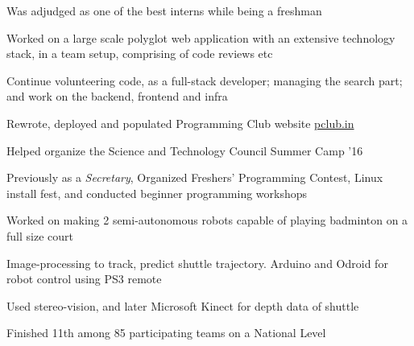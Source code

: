\documentclass[a4paper]{deedy-resume} %
\begin{document}
\begin{minipage}[t]{0.66\textwidth}
  \sectionspace

  \runsubsection{}

  \begin{tightitemize}
  \item Was adjudged as one of the best interns while being a freshman
  \item Worked on a large scale polyglot web application with an extensive
    technology stack, in a team setup, comprising of code reviews etc
  \item Continue volunteering code, as a full-stack developer;
    managing the search part; and work on the backend, frontend and infra
  \end{tightitemize}

  \sectionspace

  \runsubsection{}
  \begin{tightitemize}
  \item Rewrote, deployed and populated Programming Club website \href{https://pclub.in}{pclub.in}
  \item Helped organize the Science and Technology Council Summer Camp
    '16
  \item Previously as a \textit{Secretary}, Organized Freshers'
    Programming Contest, Linux install fest, and conducted beginner
    programming workshops
  \end{tightitemize}

  \sectionspace

  \runsubsection{}
  \begin{tightitemize}
  \item Worked on making 2 semi-autonomous robots capable of playing badminton on a full size court
  \item Image-processing to track, predict shuttle trajectory. Arduino
    and Odroid for robot control using PS3 remote
  \item Used stereo-vision, and later Microsoft Kinect for depth data
    of shuttle
  \item Finished 11th among 85 participating teams on a National Level
  \end{tightitemize}

  \sectionspace


\end{minipage}
\end{document}
